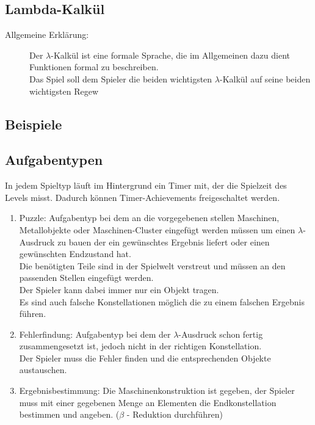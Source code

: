 \documentclass{scrartcl}
\begin{document}
\subsection{Lambda-Kalkül}



\begin{description}
	
	\item[Allgemeine Erklärung:] \label{LambdaKalkül:AlgemeineErklärung} Der $\lambda$-Kalkül ist eine formale Sprache, die im Allgemeinen dazu dient Funktionen formal zu beschreiben.\\
	Das Spiel soll dem Spieler die beiden wichtigsten $\lambda$-Kalkül auf seine beiden wichtigsten Regew

							
\end{description}

\subsection{Beispiele}




\subsection{Aufgabentypen} \label{subsection:Aufgabentypen}

In jedem Spieltyp läuft im Hintergrund ein Timer mit, der die Spielzeit des Levels misst. Dadurch können Timer-Achievements freigeschaltet werden.
\begin{enumerate}
	\item \label{aufgabentyp:puzzle} Puzzle: Aufgabentyp bei dem an die vorgegebenen stellen Maschinen, Metallobjekte oder Maschinen-Cluster eingefügt werden müssen um einen $\lambda$-Ausdruck zu bauen der ein gewünschtes Ergebnis liefert oder einen gewünschten Endzustand hat.\\
	Die benötigten Teile sind in der Spielwelt verstreut und müssen an den passenden Stellen eingefügt werden.\\
	Der Spieler kann dabei immer nur ein Objekt tragen.\\
	Es sind auch falsche Konstellationen möglich die zu einem falschen Ergebnis führen.\\
	\item \label{aufgabentyp:fehlerfindung} Fehlerfindung: Aufgabentyp bei dem der $\lambda$-Ausdruck schon fertig zusammengesetzt ist, jedoch nicht in der richtigen Konstellation.\\
	Der Spieler muss die Fehler finden und die entsprechenden Objekte austauschen.\\
	\item \label{aufgabentyp:ergebnis} Ergebnisbestimmung: Die Maschinenkonstruktion ist gegeben, der Spieler muss mit einer gegebenen Menge an Elementen die Endkonstellation bestimmen und angeben. ($\beta$ - Reduktion durchführen) 
\end{enumerate}
\end{document}
